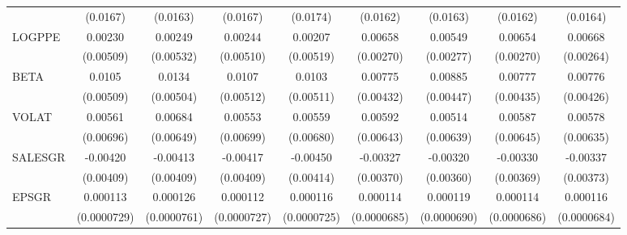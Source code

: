 \begin{table}[htbp]
\begin{tabular}{l*{8}{c}}
                    &    (0.0167)         &    (0.0163)         &    (0.0167)         &    (0.0174)         &    (0.0162)         &    (0.0163)         &    (0.0162)         &    (0.0164)         \\
LOGPPE              &     0.00230         &     0.00249         &     0.00244         &     0.00207         &     0.00658\sym{**} &     0.00549\sym{*}  &     0.00654\sym{**} &     0.00668\sym{**} \\
                    &   (0.00509)         &   (0.00532)         &   (0.00510)         &   (0.00519)         &   (0.00270)         &   (0.00277)         &   (0.00270)         &   (0.00264)         \\
BETA                &      0.0105\sym{**} &      0.0134\sym{***}&      0.0107\sym{**} &      0.0103\sym{**} &     0.00775\sym{*}  &     0.00885\sym{*}  &     0.00777\sym{*}  &     0.00776\sym{*}  \\
                    &   (0.00509)         &   (0.00504)         &   (0.00512)         &   (0.00511)         &   (0.00432)         &   (0.00447)         &   (0.00435)         &   (0.00426)         \\
VOLAT               &     0.00561         &     0.00684         &     0.00553         &     0.00559         &     0.00592         &     0.00514         &     0.00587         &     0.00578         \\
                    &   (0.00696)         &   (0.00649)         &   (0.00699)         &   (0.00680)         &   (0.00643)         &   (0.00639)         &   (0.00645)         &   (0.00635)         \\
SALESGR             &    -0.00420         &    -0.00413         &    -0.00417         &    -0.00450         &    -0.00327         &    -0.00320         &    -0.00330         &    -0.00337         \\
                    &   (0.00409)         &   (0.00409)         &   (0.00409)         &   (0.00414)         &   (0.00370)         &   (0.00360)         &   (0.00369)         &   (0.00373)         \\
EPSGR               &    0.000113         &    0.000126         &    0.000112         &    0.000116         &    0.000114\sym{*}  &    0.000119\sym{*}  &    0.000114\sym{*}  &    0.000116\sym{*}  \\
                    & (0.0000729)         & (0.0000761)         & (0.0000727)         & (0.0000725)         & (0.0000685)         & (0.0000690)         & (0.0000686)         & (0.0000684)         \\

\end{tabular}
\end{table}
